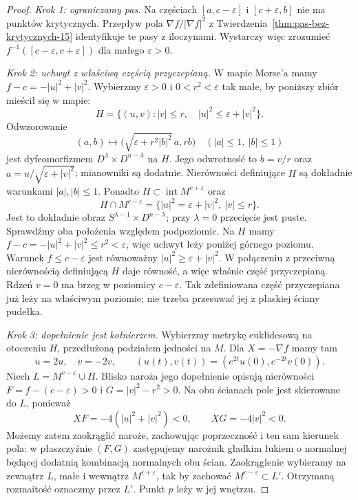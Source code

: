 \begin{proof}
\emph{Krok 1: ograniczamy pas.}
Na częściach $[a,c-\varepsilon]$
i $[c+\varepsilon,b]$ nie ma
punktów krytycznych.
Przepływ pola $\nabla f/|\nabla f|^2$
z Twierdzenia~\ref{thm:pas-bez-krytycznych-15}
identyfikuje te pasy z iloczynami.
Wystarczy więc zrozumieć
$f^{-1}([c-\varepsilon,c+\varepsilon])$
dla małego $\varepsilon>0$.

\emph{Krok 2: uchwyt z właściwą częścią przyczepianą.}
W mapie Morse'a mamy $f-c=-|u|^2+|v|^2$.
Wybierzmy $\varepsilon>0$ i $0<r^2<\varepsilon$
tak małe, by poniższy zbiór mieścił się w mapie:
\[
 H=\{(u,v): |v|\leq r,\quad |u|^2\leq\varepsilon+|v|^2\}.
\]
Odwzorowanie
\[
 (a,b)\longmapsto
 \bigl(\sqrt{\varepsilon+r^2|b|^2}\,a,rb\bigr)
 \quad (|a|\leq1,\ |b|\leq1)
\]
jest dyfeomorfizmem $D^\lambda\times D^{n-\lambda}$ na $H$.
Jego odwrotność to $b=v/r$ oraz
$a=u/\sqrt{\varepsilon+|v|^2}$; mianowniki są dodatnie.
Nierówności definiujące $H$ są dokładnie warunkami $|a|,|b|\leq1$.
Ponadto $H\subset\operatorname{int}M^{c+\varepsilon}$ oraz
\[
 H\cap M^{c-\varepsilon}
 =\{|u|^2=\varepsilon+|v|^2,\ |v|\leq r\}.
\]
Jest to dokładnie obraz $S^{\lambda-1}\times D^{n-\lambda}$;
przy $\lambda=0$ przecięcie jest puste.
Sprawdźmy oba położenia względem podpoziomic.
Na $H$ mamy $f-c=-|u|^2+|v|^2\leq r^2<\varepsilon$,
więc uchwyt leży poniżej górnego poziomu.
Warunek $f\leq c-\varepsilon$ jest równoważny
$|u|^2\geq\varepsilon+|v|^2$.
W połączeniu z przeciwną nierównością definiującą $H$
daje równość, a więc właśnie część przyczepianą.
Rdzeń $v=0$ ma brzeg w poziomicy $c-\varepsilon$.
Tak zdefiniowana część przyczepiana już leży na właściwym
poziomie; nie trzeba przesuwać jej z płaskiej ściany pudełka.

\emph{Krok 3: dopełnienie jest kołnierzem.}
Wybierzmy metrykę euklidesową na otoczeniu $H$,
przedłużoną podziałem jedności na $M$.
Dla $X=-\nabla f$ mamy tam
\[
 \dot u=2u,\quad\dot v=-2v,\qquad
 (u(t),v(t))=(e^{2t}u(0),e^{-2t}v(0)).
\]
Niech $L=M^{c-\varepsilon}\cup H$.
Blisko naroża jego dopełnienie opisują nierówności
$F=f-(c-\varepsilon)>0$ i $G=|v|^2-r^2>0$.
Na obu ścianach pole jest skierowane do $L$, ponieważ
\[
 XF=-4(|u|^2+|v|^2)<0,\qquad XG=-4|v|^2<0.
\]
Możemy zatem zaokrąglić naroże, zachowując poprzeczność
i ten sam kierunek pola: w płaszczyźnie $(F,G)$
zastępujemy narożnik gładkim łukiem o normalnej
będącej dodatnią kombinacją normalnych obu ścian.
Zaokrąglenie wybieramy na zewnątrz $L$, małe i wewnątrz
$M^{c+\varepsilon}$, tak by zachować $M^{c-\varepsilon}\subset L'$.
Otrzymaną rozmaitość oznaczmy przez $L'$.
Punkt $p$ leży w jej wnętrzu.


\end{proof}
